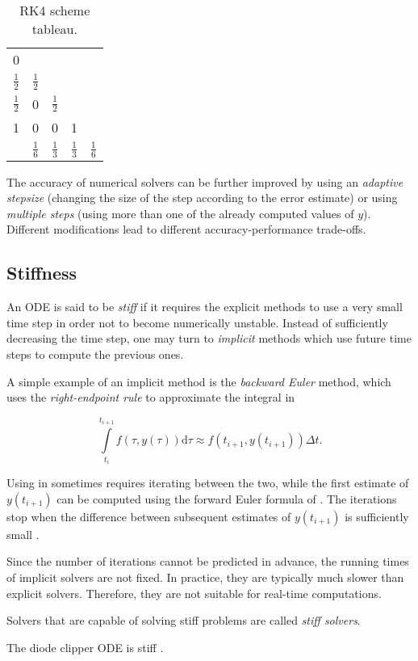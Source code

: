 \begin{table}
  \centering
  \caption{\ac{RK}4 scheme tableau.}
  \bgroup
  \def\arraystretch{1.5}%
  \begin{tabular}{c | c c c c}
    0 & & & &\\
    $\frac{1}{2}$ & $\frac{1}{2}$ & & &\\
    $\frac{1}{2}$ & 0 & $\frac{1}{2}$ & &\\
    1 & 0 & 0 & 1 &\\ \hline
      & $\frac{1}{6}$ & $\frac{1}{3}$ & $\frac{1}{3}$ & $\frac{1}{6}$ \\    
  \end{tabular}
  \egroup
  \label{tab:rk4_tableau}
\end{table}

The accuracy of numerical solvers can be further improved by using an \emph{adaptive stepsize} (changing the size of the step according to the error estimate) or using \emph{multiple steps} (using more than one of the already computed values of $y$). Different modifications lead to different accuracy-performance trade-offs.

\subsection{Stiffness}
\label{subsection:stiffness}

An \ac{ODE} is said to be \emph{stiff} if it requires the explicit methods to use a very small time step in order not to become numerically unstable. Instead of sufficiently decreasing the time step, one may turn to \emph{implicit} methods which use future time steps to compute the previous ones.

A simple example of an implicit method is the \emph{backward Euler} method, which uses the \emph{right-endpoint rule} to approximate the integral in  \cite{Gockenbach2011}

\begin{equation}
    \int \limits_{t_i}^{t_{i+1}} f(\tau, y(\tau)) \mathrm{d} \tau \approx f(t_{i+1}, y(t_{i+1}))\Delta t.
  \label{eq:backward_euler}
\end{equation}

Using  in  sometimes requires iterating between the two, while the first estimate of $y(t_{i+1})$ can be computed using the forward Euler formula of . The iterations stop when the difference between subsequent estimates of $y(t_{i+1})$ is sufficiently small \cite{Yeh2007}. 

Since the number of iterations cannot be predicted in advance, the running times of implicit solvers are not fixed. In practice, they are typically much slower than explicit solvers. Therefore, they are not suitable for real-time computations.

Solvers that are capable of solving stiff problems are called \emph{stiff solvers}.

The diode clipper \ac{ODE} is stiff \cite{Parker2019}.
